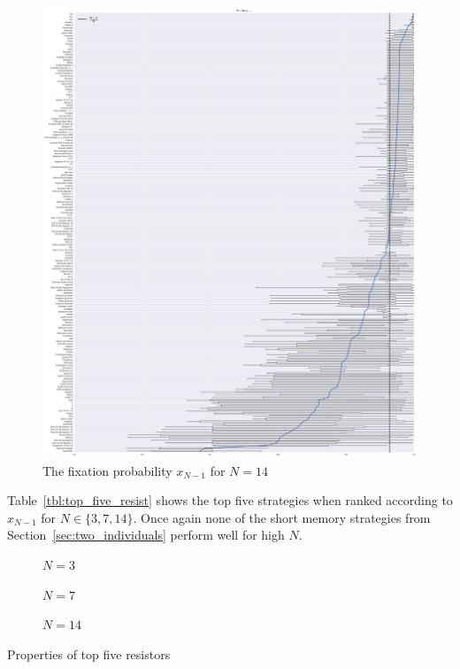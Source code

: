 \documentclass{article}
\begin{document}
\begin{figure}[!hbtp]
    \centering
    \includegraphics[height=.9\textheight]{./img/boxplot_14_resist.pdf}
    \caption{The fixation probability \(x_{N-1}\) for \(N=14\)}
    \label{fig:boxplot_14_resist}
\end{figure}

Table~\ref{tbl:top_five_resist} shows the top five strategies when ranked
according to \(x_{N-1}\) for \(N\in\{3, 7, 14\}\).
Once again none of the short memory strategies from
Section~\ref{sec:two_individuals} perform well for high \(N\).

\begin{table}[!hbtp]
    \begin{subfigure}[t]{\textwidth}
        \centering
        
        \caption{\(N=3\)}
    \end{subfigure}
    \begin{subfigure}[t]{\textwidth}
        \centering
        
        \caption{\(N=7\)}
    \end{subfigure}
    \begin{subfigure}[t]{\textwidth}
        \centering
        
        \caption{\(N=14\)}
    \end{subfigure}
    \caption{Properties of top five resistors}
    \label{tbl:top_five_resist}
\end{table}
\end{document}
